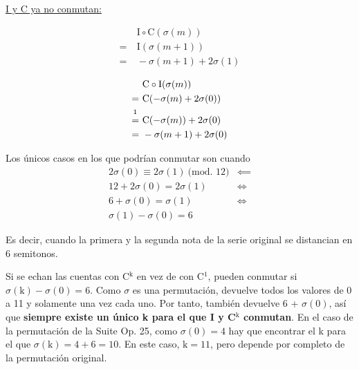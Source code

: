 		 \underline{I y C ya no conmutan:}
		\vspace{-2\bigskipamount}
		\begin{multicols}{2}
			\begin{align*}
			&\ \text{I}\circ\text{C}(\sigma(m))\\
			=&\ \text{I}(\sigma(m+1))\\
			=&\ -\sigma(m+1)+2\sigma(1)
			\end{align*}
			
			\begin{align*}
			&\ \text{C}\circ\text{I}(\sigma(m))\\
			=&\ \text{C}(-\sigma(m)+2\sigma(0))\\
			\overset{\footnotemark}{=}&\ \text{C}(-\sigma(m))+2\sigma(0)\\
			=&\ -\sigma(m+1)+2\sigma(0)
			\end{align*}
		\end{multicols}
		
		Los únicos casos en los que podrían conmutar son cuando
		\begin{align*}
		2\sigma\left(0\right)\equiv2\sigma(1)\ \text{(mod. 12)}&\impliedby\\
		12+2\sigma\left(0\right)=2\sigma\left(1\right)&\Longleftrightarrow\\
		6+\sigma\left(0\right)=\sigma\left(1\right)&\Longleftrightarrow\\
		\sigma\left(1\right)-\sigma\left(0\right)=6&
		\end{align*}
		
		Es decir, cuando la primera y la segunda nota de la serie original se distancian en 6 semitonos.
		
		Si se echan las cuentas con C$^\text{k}$ en vez de con C$^1$, pueden conmutar si $\sigma\left(\text{k}\right)-\sigma\left(0\right)=6$. Como $\sigma$ es una permutación, devuelve todos los valores de 0 a 11 y solamente una vez cada uno. Por tanto, también devuelve 6 + $\sigma(0)$, así que \textbf{siempre existe un único k para el que I y C$^\text{k}$ conmutan}. En el caso de la permutación de la Suite Op. 25, como $\sigma\left(0\right)=4$ hay que encontrar el k para el que $\sigma\left(\text{k}\right)=4+6=10$. En este caso, $\text{k}=11$, pero depende por completo de la permutación original.\\
		
